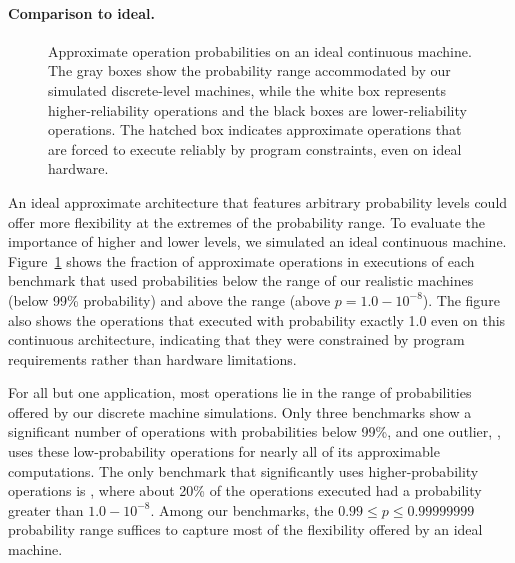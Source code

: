 {\paragraph{Comparison to ideal.}

\begin{figure}
    \hspace{-3ex}
    
    \caption{Approximate operation probabilities on an ideal continuous
    machine. The gray boxes show the probability range accommodated by
    our simulated discrete-level machines, while the white box represents
    higher-reliability operations and the black boxes are
    lower-reliability operations.
    The hatched box indicates approximate operations that are forced to
    execute reliably by program constraints, even on ideal hardware.}
    \label{fig:idealhist}
\end{figure}

An ideal approximate architecture that features arbitrary probability levels
could offer more flexibility at the extremes of the probability range.
To evaluate the importance of higher and lower levels, we
simulated an ideal continuous machine.
Figure~\ref{fig:idealhist} shows the fraction of approximate operations in
executions of each benchmark that used probabilities below the range of our
realistic machines (below 99\% probability) and above the range (above $p =
1.0 - 10^{-8}$).
The figure also shows the operations that executed with probability exactly
1.0 even on this continuous architecture, indicating that they were
constrained by program requirements rather than hardware limitations.

For all but one application, most operations lie in the range of probabilities
offered by our discrete machine simulations.
Only three benchmarks show a significant number of operations with
probabilities below 99\%, and one outlier, , uses these
low-probability operations for nearly all of its approximable computations.
The only benchmark that significantly uses higher-probability operations
is , where about 20\% of the operations executed had a probability
greater than $1.0 - 10^{-8}$.
Among our benchmarks, the $0.99 \le p \le 0.99999999$ probability range
suffices to capture most of the flexibility offered by an ideal machine.


}
